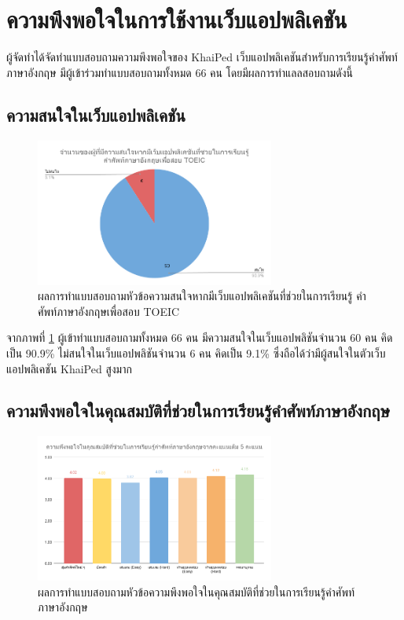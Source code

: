 \documentclass[12pt,oneside,openright,a4paper]{cpe-thai-project}
\begin{document}
\pagebreak
\section{ความพึงพอใจในการใช้งานเว็บแอปพลิเคชัน}
\hspace{1cm}
ผู้จัดทำได้จัดทำแบบสอบถามความพึงพอใจของ KhaiPed เว็บแอปพลิเคชันสำหรับการเรียนรู้คำศัพท์ภาษาอังกฤษ
มีผู้เข้าร่วมทำแบบสอบถามทั้งหมด 66 คน โดยมีผลการทำแลลสอบถามดังนี้

\subsection{ความสนใจในเว็บแอปพลิเคชัน}
\begin{figure}[!h]\centering
	\includegraphics[width=0.7\textwidth, keepaspectratio=true]{image/appendix/2nd/interest.png}
	\caption{{ผลการทำแบบสอบถามหัวข้อความสนใจหากมีเว็บแอปพลิเคชันที่ช่วยในการเรียนรู้ คำศัพท์ภาษาอังกฤษเพื่อสอบ TOEIC}}\label{fig:apdx2ndInterest}
\end{figure}

\hspace{1cm}
จากภาพที่ \ref{fig:apdx2ndInterest} ผู้เข้าทำแบบสอบถามทั้งหมด 66 คน มีความสนใจในเว็บแอปพลิชันจำนวน 60 คน คิดเป็น 90.9\% ไม่สนใจในเว็บแอปพลิชันจำนวน 6 คน คิดเป็น 9.1\%
ซึ่งถือได้ว่ามีผู้สนใจในตัวเว็บแอปพลิเคชัน KhaiPed สูงมาก

\pagebreak
\subsection{ความพึงพอใจในคุณสมบัติที่ช่วยในการเรียนรู้คำศัพท์ภาษาอังกฤษ}
\begin{figure}[!h]\centering
	\includegraphics[width=0.7\textwidth, keepaspectratio=true]{image/appendix/2nd/feature.png}
	\caption{{ผลการทำแบบสอบถามหัวข้อความพึงพอใจในคุณสมบัติที่ช่วยในการเรียนรู้คำศัพท์ภาษาอังกฤษ}}\label{fig:apdx2ndFeature}
\end{figure}
\end{document}
